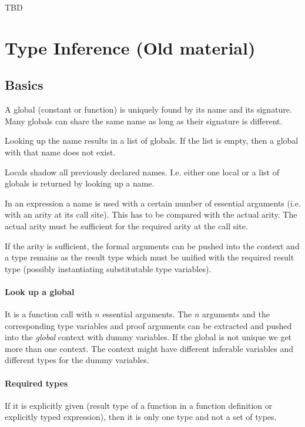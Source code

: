 \vskip 5mm
TBD
\vskip 5mm







\newpage
\section{Type Inference (Old material)}

\subsection{Basics}

A global (constant or function) is uniquely found by its name and its
signature. Many globals can share the same name as long as their signature is
different.

Looking up the name results in a list of globals. If the list is empty, then a
global with that name does not exist.

Locals shadow all previously declared names. I.e. either one local or a list
of globals is returned by looking up a name.

In an expression a name is used with a certain number of essential arguments
(i.e. with an arity at its call site). This has to be compared with the actual
arity. The actual arity must be sufficient for the required arity at the call
site.

If the arity is sufficient, the formal arguments can be pushed into the
context and a type remains as the result type which must be unified with the
required result type (possibly instantiating substitutable type variables).


\paragraph{Look up a global} It is a function call with $n$ essential
arguments. The $n$ arguments and the corresponding type variables and proof
arguments can be extracted and pushed into the \emph{global} context with
dummy variables. If the global is not unique we get more than one context. The
context might have different inferable variables and different types for the
dummy variables.

\paragraph{Required types}
If it is explicitly given (result type of a function in a function definition
or explicitly typed expression), then it is only one type and not a set of
types.

